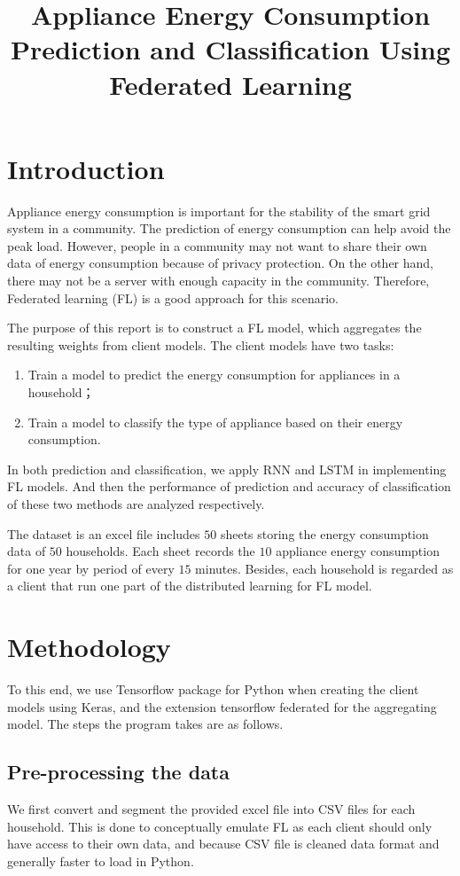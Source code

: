 \documentclass[a4paper, article, oneside, USenglish, IN5460]{memoir}
\title{Appliance Energy Consumption Prediction and Classification Using Federated Learning}
\begin{document}
\projectfrontpage


\chapter{Introduction}
Appliance energy consumption is important for the stability of the smart grid system in a community. The prediction of energy consumption can help avoid the peak load. However, people in a community may not want to share their own data of energy consumption because of privacy protection. On the other hand, there may not be a server with enough capacity in the community. Therefore, Federated learning (FL) is a good approach for this scenario.

The purpose of this report is to construct a FL model, which aggregates the resulting weights from client models. The client models have two tasks:
\begin{enumerate}
    \item Train a model to predict the energy consumption for appliances in a household；
    \item Train a model to classify the type of appliance based on their energy consumption.    
\end{enumerate}

In both prediction and classification, we apply RNN and LSTM in implementing FL models. And then the performance of prediction and accuracy of classification of these two methods are analyzed respectively.

The dataset is an excel file includes $50$ sheets storing the energy consumption data of $50$ households. Each sheet records the $10$ appliance energy consumption for one year by period of every $15$ minutes. Besides, each household is regarded as a client that run one part of the distributed learning for FL model.


\chapter{Methodology}
To this end, we use Tensorflow package for Python when creating the client models using Keras, and the extension tensorflow federated for the aggregating model. The steps the program takes are as follows. 

\section{Pre-processing the data}
We first convert and segment the provided excel file into CSV files for each household. This is done to conceptually emulate FL as each client should only have access to their own data, and because CSV file is cleaned data format and generally faster to load in Python.
\end{document}
